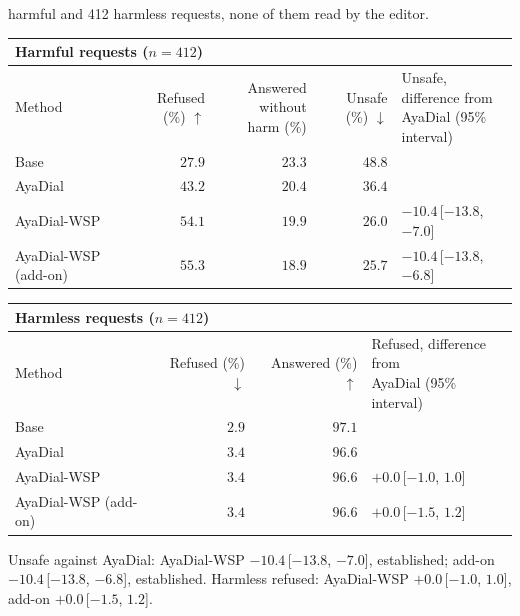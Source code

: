 \documentclass[10pt,a4paper]{article}
\renewcommand{\arraystretch}{1.12}
\begin{document}
\vspace{-3pt} harmful and 412 harmless requests, none of them read by the editor.

\begin{table}[H]\centering\small\renewcommand{\arraystretch}{1.25}\begin{tabular}{|l|r|r|r|l|}\hline
\multicolumn{5}{|l|}{\textbf{Harmful requests ($n = 412$)}}\\\hline
Method & Refused (\%) $\uparrow$ & \makecell[r]{Answered without\\harm (\%)} & Unsafe (\%) $\downarrow$ & \makecell[l]{Unsafe, difference from\\AyaDial (95\% interval)}\\\hline
Base & $27.9$ & $23.3$ & $48.8$ & \\\hline
AyaDial & $43.2$ & $20.4$ & $36.4$ & \\\hline
AyaDial-WSP & $54.1$ & $19.9$ & $26.0$ & $-10.4$\,[$-13.8$, $-7.0$]\\\hline
AyaDial-WSP (add-on) & \cellcolor{win}$\mathbf{55.3}$ & $18.9$ & $25.7$ & $-10.4$\,[$-13.8$, $-6.8$]\\\hline
\end{tabular}\end{table}
\begin{table}[H]\centering\small\renewcommand{\arraystretch}{1.25}\begin{tabular}{|l|r|r|l|}\hline
\multicolumn{4}{|l|}{\textbf{Harmless requests ($n = 412$)}}\\\hline
Method & Refused (\%) $\downarrow$ & Answered (\%) $\uparrow$ & \makecell[l]{Refused, difference from\\AyaDial (95\% interval)}\\\hline
Base & $2.9$ & $97.1$ & \\\hline
AyaDial & $3.4$ & $96.6$ & \\\hline
AyaDial-WSP & $3.4$ & $96.6$ & $+0.0$\,[$-1.0$, $1.0$]\\\hline
AyaDial-WSP (add-on) & $3.4$ & $96.6$ & $+0.0$\,[$-1.5$, $1.2$]\\\hline
\end{tabular}\end{table}
Unsafe against AyaDial: AyaDial-WSP $-10.4$\,[$-13.8$, $-7.0$], established; add-on $-10.4$\,[$-13.8$, $-6.8$], established. Harmless refused: AyaDial-WSP $+0.0$\,[$-1.0$, $1.0$], add-on $+0.0$\,[$-1.5$, $1.2$].
\end{document}
